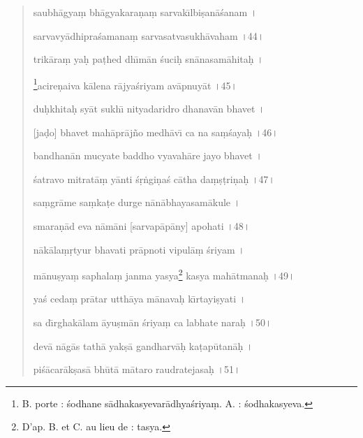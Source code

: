 \documentclass[a4paper, 11pt, oneside, french, landscape, twocolumn]{article}
\begin{document}
\begin{quotation}
saubh\={a}gya\d{m} bh\={a}gyakara\d{n}a\d{m} sarvak\={\i}lbi\d{s}an\={a}\'{s}anam \texthindi{।}

sarvavy\={a}dhipra\'{s}amana\d{m} sarvasatvasukh\={a}vaham \texthindi{।}44\texthindi{।}

\bigskip

trik\={a}ra\d{m} ya\d{h} pa\d{t}hed dh\={\i}m\={a}n \'{s}uci\d{h} sn\={a}nasam\={a}hita\d{h} \texthindi{।}

\footnote{B. porte : \'{s}odhane s\={a}dhakasyevar\={a}dhya\'{s}riya\d{m}. A. : \'{s}odhakasyeva.}acire\d{n}aiva k\={a}lena r\={a}jya\'{s}riyam av\={a}pnuy\={a}t \texthindi{।}45\texthindi{।}

\bigskip

du\d{h}khita\d{h} sy\={a}t sukh\={\i} nityadaridro dhanav\={a}n bhavet \texthindi{।}

[ja\d{d}o] bhavet mah\={a}pr\={a}j\~{n}o medh\={a}v\={\i} ca na sa\d{m}\'{s}aya\d{h} \texthindi{।}46\texthindi{।}

\bigskip

bandhan\={a}n mucyate baddho vyavah\={a}re jayo bhavet \texthindi{।}

\'{s}atravo mitrat\={a}\d{m} y\={a}nti \'{s}\d{r}\.{n}gi\d{n}a\'{s} c\={a}tha da\d{m}\d{s}\d{t}ri\d{n}a\d{h} \texthindi{।}47\texthindi{।}

\bigskip

sa\d{m}gr\={a}me sa\d{m}ka\d{t}e durge n\={a}n\={a}bhayasam\={a}kule \texthindi{।}

smara\d{n}\={a}d eva n\={a}m\={a}ni [sarvap\={a}p\={a}ny] apohati \texthindi{।}48\texthindi{।}

\bigskip

n\={a}k\={a}la\d{m}\d{r}tyur bhavati pr\={a}pnoti vipul\={a}\d{m} \'{s}riyam \texthindi{।}

m\={a}nu\d{s}ya\d{m} saphala\d{m} janma yasya\footnote{D'ap. B. et C. au lieu de : tasya.} kasya mah\={a}tmana\d{h} \texthindi{।}49\texthindi{।}

\bigskip

ya\'{s} ceda\d{m} pr\={a}tar utth\={a}ya m\={a}nava\d{h} k\={\i}rtayi\d{s}yati \texthindi{।}

sa d\={\i}rghak\={a}lam \={a}yu\d{s}m\={a}n \'{s}riya\d{m} ca labhate nara\d{h} \texthindi{।}50\texthindi{।}

\bigskip

dev\={a} n\={a}g\={a}s tath\={a} yak\d{s}\={a} gandharv\={a}\d{h} ka\d{t}ap\={u}tan\={a}\d{h} \texthindi{।}

pi\'{s}\={a}car\={a}k\d{s}as\={a} bh\={u}t\={a} m\={a}taro raudratejasa\d{h} \texthindi{।}51\texthindi{।}


\end{quotation}
\end{document}
